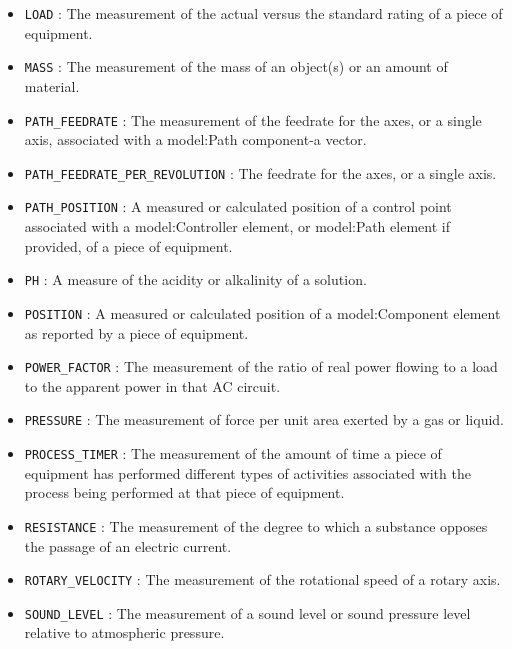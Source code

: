 \begin{itemize}
\item \texttt{LOAD} : The measurement of the actual versus the standard rating of a piece of equipment. 

\item \texttt{MASS} : The measurement of the mass of an object(s) or an amount of material. 

\item \texttt{PATH_FEEDRATE} : The measurement of the feedrate for the axes, or a single axis, associated with a {model:Path} component-a vector. 

\item \texttt{PATH_FEEDRATE_PER_REVOLUTION} : The feedrate for the axes, or a single axis. 

\item \texttt{PATH_POSITION} : A measured or calculated position of a control point associated with a {model:Controller} element, or {model:Path} element if provided, of a piece of equipment. 

\item \texttt{PH} : A measure of the acidity or alkalinity of a solution. 

\item \texttt{POSITION} : A measured or calculated position of a {model:Component} element as reported by a piece of equipment. 

\item \texttt{POWER_FACTOR} : The measurement of the ratio of real power flowing to a load to the apparent power in that AC circuit. 

\item \texttt{PRESSURE} : The measurement of force per unit area exerted by a gas or liquid. 

\item \texttt{PROCESS_TIMER} : The measurement of the amount of time a piece of equipment has performed different types of activities associated with the process being performed at that piece of equipment. 

\item \texttt{RESISTANCE} : The measurement of the degree to which a substance opposes the passage of an electric current. 

\item \texttt{ROTARY_VELOCITY} : The measurement of the rotational speed of a rotary axis. 

\item \texttt{SOUND_LEVEL} : The measurement of a sound level or sound pressure level relative to atmospheric pressure. 


\end{itemize}
